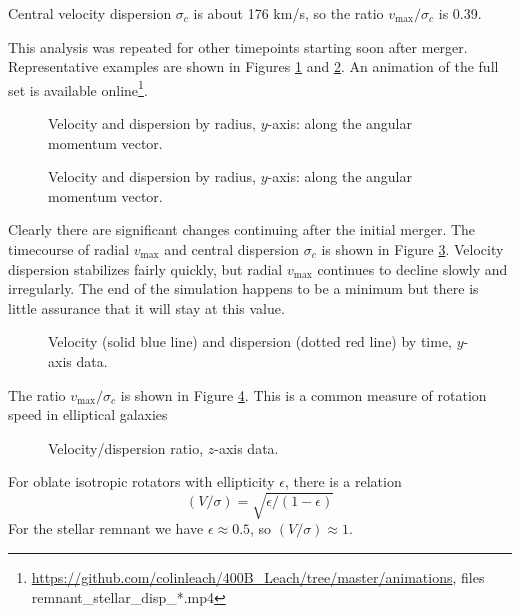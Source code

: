 \documentclass[twocolumn]{aastex63}
\newcommand{\todo}{\color{red}{TODO}\color{black}\hspace{2mm}}
\begin{document}
Central velocity dispersion $\sigma_c$ is about 176 km/s, so the ratio $v_{\text{max}} / \sigma_c$ is 0.39. \todo{Comment}

This analysis was repeated for other timepoints starting soon after merger. Representative examples are shown in Figures \ref{fig:rem_disp_y_450} and \ref{fig:rem_disp_y_600}. An animation of the full set is available online\footnote{\url{https://github.com/colinleach/400B_Leach/tree/master/animations}, files remnant\_stellar\_disp\_*.mp4 }.

\begin{figure}[htb!]
	\caption{Velocity and dispersion by radius, $y$-axis: along the angular momentum vector.
		\label{fig:rem_disp_y_450}}
\end{figure}

\begin{figure}[htb!]
	\caption{Velocity and dispersion by radius, $y$-axis: along the angular momentum vector.
		\label{fig:rem_disp_y_600}}
\end{figure}

Clearly there are significant changes continuing after the initial merger. The timecourse of radial $v_{\text{max}}$ and central dispersion $\sigma_c$ is shown in Figure \ref{fig:rem_st_vdisp_tc}. Velocity dispersion stabilizes fairly quickly, but radial $v_{\text{max}}$ continues to decline slowly and irregularly. The end of the simulation happens to be a minimum but there is little assurance that it will stay at this value.

\begin{figure}[htb!]
	\caption{Velocity (solid blue line) and dispersion (dotted red line) by time, $y$-axis data.
		\label{fig:rem_st_vdisp_tc}}
\end{figure}

The ratio $v_{\text{max}} / \sigma_c$ is shown in Figure \ref{fig:rem_st_vdisp_ratio}. This is a common measure of rotation speed in elliptical galaxies \todo{ref?? discussion?} 

\begin{figure}[htb!]
	\caption{Velocity/dispersion ratio, $z$-axis data.
		\label{fig:rem_st_vdisp_ratio}}
\end{figure}


For oblate isotropic rotators with ellipticity $\epsilon$, there is a relation \todo{Binney78 ref}
\[ (V/\sigma) = \sqrt{\epsilon / (1 - \epsilon)} \]
For the stellar remnant we have $\epsilon \approx 0.5$, so $(V/\sigma) \approx 1$.
\end{document}
